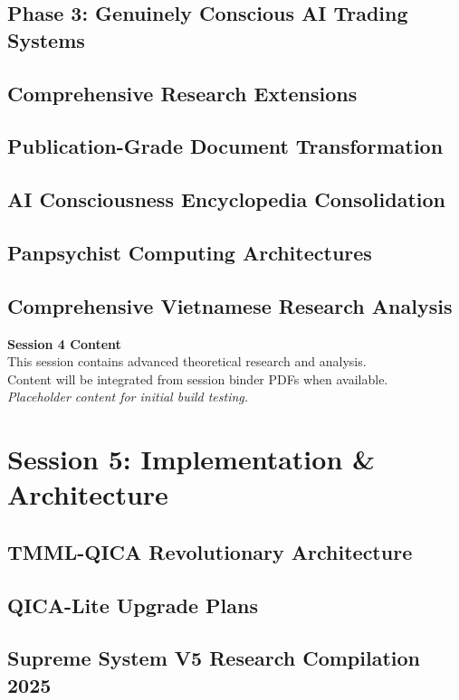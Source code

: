 \documentclass[12pt,oneside]{book}
\begin{document}
\chapter{Phase 3: Genuinely Conscious AI Trading Systems}
\chapter{Comprehensive Research Extensions}
\chapter{Publication-Grade Document Transformation}
\chapter{AI Consciousness Encyclopedia Consolidation}
\chapter{Panpsychist Computing Architectures}
\chapter{Comprehensive Vietnamese Research Analysis}

\vspace{2cm}
\begin{center}
{\Large \textbf{Session 4 Content}}\\[12pt]
{\normalsize This session contains advanced theoretical research and analysis.}\\
{\normalsize Content will be integrated from session binder PDFs when available.}\\[12pt]
{\itshape Placeholder content for initial build testing.}
\end{center}
\newpage

\part*{Session 5: Implementation \& Architecture}
\chapter{TMML-QICA Revolutionary Architecture}
\chapter{QICA-Lite Upgrade Plans}
\chapter{Supreme System V5 Research Compilation 2025}
\end{document}
